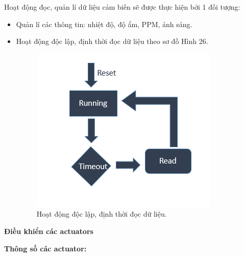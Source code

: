 \documentclass[a4paper,12pt,oneside]{article}
\begin{document}
\noindent Hoạt động đọc, quản lí dữ liệu cảm biến sẽ được thực hiện bởi 1 đối tượng:
\begin{itemize}
\item Quản lí các thông tin: nhiệt độ, độ ẩm, PPM, ánh sáng.
\item Hoạt động độc lập, định thời đọc dữ liệu theo sơ đồ Hình 26.

\begin{figure}[H]
	\centering
	\includegraphics[scale=0.9]{hinh/sensor.PNG}
	\caption{Hoạt động độc lập, định thời đọc dữ liệu.}
\end{figure}

\end{itemize}

\newpage
\noindent \textbf{Điều khiển các actuators}

\textbf{Thông số các actuator:}
\end{document}
